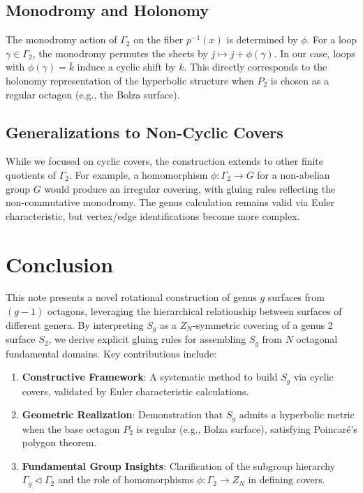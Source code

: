 \documentclass{article}
\theoremstyle{definition}
\theoremstyle{remark}
\begin{document}
\subsection{Monodromy and Holonomy}
The monodromy action of \(\Gamma_2\) on the fiber \(p^{-1}(x)\) is determined by \(\phi\). For a loop \(\gamma \in \Gamma_2\), the monodromy permutes the sheets by \(j \mapsto j + \phi(\gamma)\). In our case, loops with \(\phi(\gamma) = \bar{k}\) induce a cyclic shift by \(k\). This directly corresponds to the holonomy representation of the hyperbolic structure when \(P_2\) is chosen as a regular octagon (e.g., the Bolza surface).

\subsection{Generalizations to Non-Cyclic Covers}
While we focused on cyclic covers, the construction extends to other finite quotients of \(\Gamma_2\). For example, a homomorphism \(\phi: \Gamma_2 \to G\) for a non-abelian group \(G\) would produce an irregular covering, with gluing rules reflecting the non-commutative monodromy. The genus calculation remains valid via Euler characteristic, but vertex/edge identifications become more complex.

\section{Conclusion}
This note presents a novel rotational construction of genus \(g\) surfaces from \((g-1)\) octagons, leveraging the hierarchical relationship between surfaces of different genera. By interpreting \(S_g\) as a \(Z_N\)-symmetric covering of a genus 2 surface \(S_2\), we derive explicit gluing rules for assembling \(S_g\) from \(N\) octagonal fundamental domains. Key contributions include:
\begin{enumerate}
    \item \textbf{Constructive Framework}: A systematic method to build \(S_g\) via cyclic covers, validated by Euler characteristic calculations.
    \item \textbf{Geometric Realization}: Demonstration that \(S_g\) admits a hyperbolic metric when the base octagon \(P_2\) is regular (e.g., Bolza surface), satisfying Poincaré's polygon theorem.
    \item \textbf{Fundamental Group Insights}: Clarification of the subgroup hierarchy \(\Gamma_g \triangleleft \Gamma_2\) and the role of homomorphisms \(\phi: \Gamma_2 \to Z_N\) in defining covers.
\end{enumerate}
\end{document}
